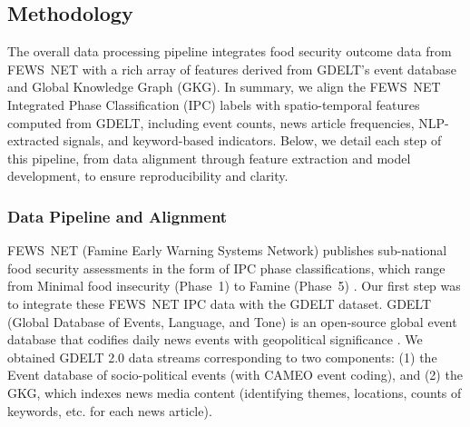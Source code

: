 \documentclass{article}
\begin{document}
\subsection{Methodology}
\label{sec:methodology}

The overall data processing pipeline integrates food security outcome data from FEWS~NET with a rich array of features derived from GDELT's event database and Global Knowledge Graph (GKG). In summary, we align the FEWS~NET Integrated Phase Classification (IPC) labels with spatio-temporal features computed from GDELT, including event counts, news article frequencies, NLP-extracted signals, and keyword-based indicators. Below, we detail each step of this pipeline, from data alignment through feature extraction and model development, to ensure reproducibility and clarity.

\subsubsection{Data Pipeline and Alignment}
FEWS~NET (Famine Early Warning Systems Network) publishes sub-national food security assessments in the form of IPC phase classifications, which range from Minimal food insecurity (Phase~1) to Famine (Phase~5) \citep{ipc2019manual}. Our first step was to integrate these FEWS~NET IPC data with the GDELT dataset. GDELT (Global Database of Events, Language, and Tone) is an open-source global event database that codifies daily news events with geopolitical significance \citep{leetaru2013gdelt}. We obtained GDELT 2.0 data streams corresponding to two components: (1) the Event database of socio-political events (with CAMEO event coding), and (2) the GKG, which indexes news media content (identifying themes, locations, counts of keywords, etc. for each news article). \\
\end{document}
